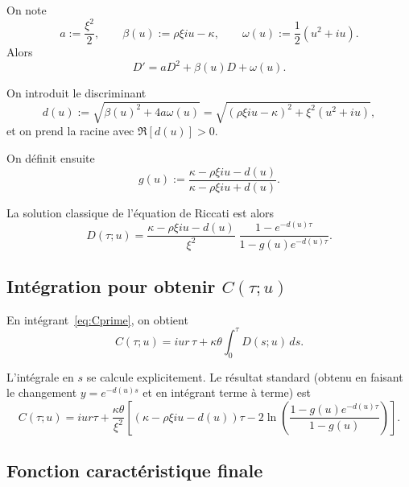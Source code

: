 \documentclass[11pt,a4paper]{article}
\newcommand{\1}{\mathbf{1}}
\begin{document}
On note
\begin{equation}
a := \frac{\xi^2}{2},\qquad
\beta(u) := \rho\xi i u - \kappa,\qquad
\omega(u) := \frac{1}{2}(u^2+i u).
\end{equation}
Alors
\begin{equation}
D' = a D^2 + \beta(u) D + \omega(u).
\end{equation}

On introduit le discriminant
\begin{equation}
d(u) := \sqrt{\beta(u)^2 + 4a\omega(u)}
      = \sqrt{(\rho\xi i u - \kappa)^2 + \xi^2(u^2+i u)},
\end{equation}
et on prend la racine avec $\Re[d(u)]>0$.

On d\'efinit ensuite
\begin{equation}
g(u) := \frac{\kappa - \rho\xi i u - d(u)}{\kappa - \rho\xi i u + d(u)}.
\end{equation}

La solution classique de l'\'equation de Riccati est alors
\begin{equation}
D(\tau;u)
= \frac{\kappa - \rho\xi i u - d(u)}{\xi^2}\;
  \frac{1 - e^{-d(u)\tau}}{1 - g(u)e^{-d(u)\tau}}.
\end{equation}

\subsection{Int\'egration pour obtenir $C(\tau;u)$}

En int\'egrant~\eqref{eq:Cprime}, on obtient
\begin{equation}
C(\tau;u) = i u r\,\tau
+ \kappa\theta\int_0^\tau D(s;u)\,ds.
\end{equation}

L'int\'egrale en $s$ se calcule explicitement. Le r\'esultat standard (obtenu
en faisant le changement $y=e^{-d(u)s}$ et en int\'egrant terme \`a terme) est
\begin{equation}
C(\tau;u)
= i u r \tau
+ \frac{\kappa\theta}{\xi^2}
  \left[
     \left(\kappa - \rho\xi i u - d(u)\right)\tau
     - 2\ln\!\left(\frac{1 - g(u)e^{-d(u)\tau}}{1 - g(u)}\right)
  \right].
\end{equation}

\subsection{Fonction caract\'eristique finale}
\end{document}
